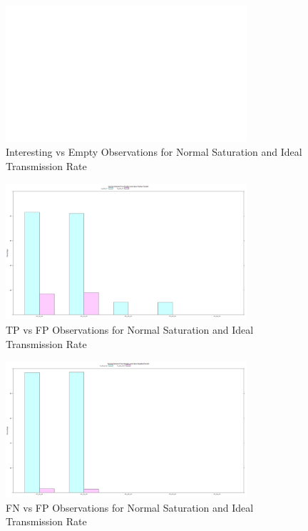 	\begin{figure}[H]
	\centering
	\includegraphics[width=0.8\textwidth]{Chap7/figures/plots/normal_ideal/emptvsint_percent.png}
	\caption{Interesting vs Empty Observations for Normal Saturation and Ideal Transmission Rate}
	\label{fig:sim:res:norm:ideal:emptint}
	\end{figure}

	\begin{figure}[H]
	\centering
	\includegraphics[width=0.8\textwidth]{Chap7/figures/plots/normal_ideal/tpvsfp_percent.png}
	\caption{TP vs FP Observations for Normal Saturation and Ideal Transmission Rate}
	\label{fig:sim:res:norm:ideal:tpfp}
	\end{figure}

	\begin{figure}[H]
	\centering
	\includegraphics[width=0.8\textwidth]{Chap7/figures/plots/normal_ideal/tnvsfn_percent.png}
	\caption{FN vs FP Observations for Normal Saturation and Ideal Transmission Rate}
	\label{fig:sim:res:norm:ideal:tnfn}
	\end{figure}


